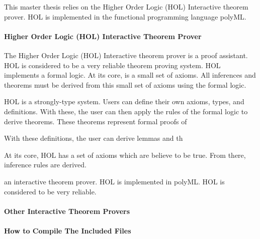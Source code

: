 \documentclass[../../main/main.tex]{subfiles}
\begin{document}
This master thesis relies on the Higher Order Logic (HOL) Interactive theorem prover.  HOL is implemented in the functional programming language polyML.

\paragraph*{Higher Order Logic (HOL) Interactive Theorem Prover}
The Higher Order Logic (HOL) Interactive theorem prover is a proof assistant.  HOL is considered to be a very reliable theorem proving system.  HOL implements a formal logic.  At its core, is a small set of axioms.  All inferences and theorems must be derived from this small set of axioms using the formal logic.


HOL is a strongly-type system.  Users can define their own axioms, types, and definitions.  With these, the user can then apply the rules of the formal logic to derive theorems.  These theorems represent formal proofs of 

With these definitions, the user can derive lemmas and th  

At its core, HOL has a set of axioms which are believe to be true.  From there, inference rules are derived. 

an interactive theorem prover.  HOL is implemented in polyML.  HOL is considered to be very reliable. 



\paragraph*{Other Interactive Theorem Provers}
\paragraph*{How to Compile The Included Files}
\end{document}
